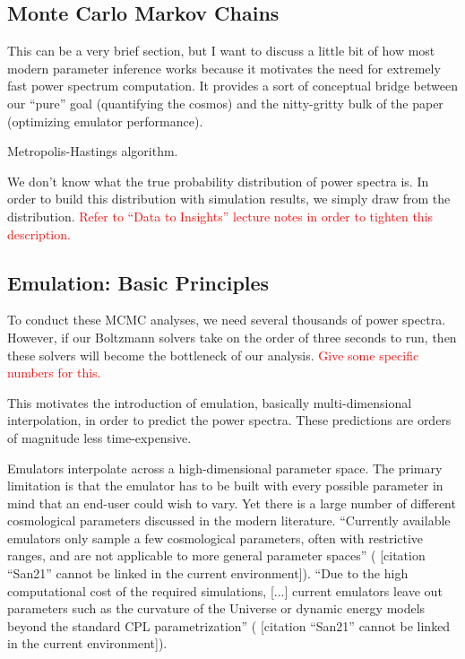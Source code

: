 \documentclass[11pt]{article}
\newcommand{\cbib}[1]
{\IfFileExists{biblatex.sty}
{\cite{#1}}
{[citation ``#1'' cannot be linked in the current environment]}}
\begin{document}
\begin{centering}
\subsection{Monte Carlo Markov Chains}
\end{centering}

This can be a very brief section, but I want to discuss a little bit of how most modern parameter inference works because it motivates the need for extremely fast power spectrum computation. It provides a sort of conceptual bridge between our ``pure'' goal (quantifying the cosmos) and the nitty-gritty bulk of the paper (optimizing emulator performance).

Metropolis-Hastings algorithm.

We don't know what the true probability distribution of power spectra is. In order to build this distribution with simulation results, we simply draw from the distribution. \textcolor{red}{Refer to ``Data to Insights'' lecture notes in order to tighten this description.}

\begin{centering}
\subsection{Emulation: Basic Principles}
\label{sec: emulation_intro}
\end{centering}

To conduct these MCMC analyses, we need several thousands of power spectra. However, if our Boltzmann solvers take on the order of three seconds to run, then these solvers will become the bottleneck of our analysis. \textcolor{red}{Give some specific numbers for this.}

This motivates the introduction of emulation, basically multi-dimensional interpolation, in order to predict the power spectra. These predictions are orders of magnitude less time-expensive. 

Emulators interpolate across a high-dimensional parameter space. The primary
limitation is that the emulator has to be built with every possible parameter
in mind that an end-user could wish to vary. Yet there is a large number of
different cosmological parameters discussed in the modern literature.
``Currently available emulators only sample a few cosmological parameters,
often with restrictive ranges, and are not applicable to more general parameter
spaces'' (\cbib{San21}). ``Due to the high computational cost of the required
simulations, [...] current emulators leave out parameters such as the curvature
of the Universe or dynamic energy models beyond the standard CPL
parametrization'' (\cbib{San21}).
\end{document}
